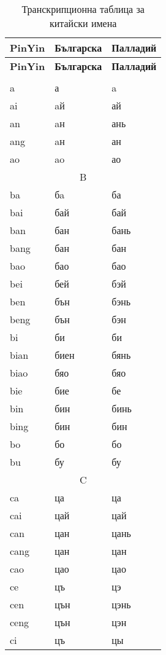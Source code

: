 \appendix

\appendixname

\begin{longtable}{|l|l|l|}
    \caption{Транскрипционна таблица за китайски имена} \label{tab:kitaiski_imena} \\
    \hline
    \textbf{PinYin} & \textbf{Българска} & \textbf{Палладий} \\
    \hline
    \endfirsthead
    \hline
    \textbf{PinYin} & \textbf{Българска} & \textbf{Палладий} \\
    \hline
    \endhead
    \hline
    \endfoot
    \hline
    \endlastfoot
    \multicolumn{3}{|c|}{A} \\
    \hline
    a &а &a\\
    ai &aй &ай
\\    an &aн &ань
\\    ang &aн &ан
\\    ao &ao &ао
 \\
    \hline
    \multicolumn{3}{|c|}{B} \\
    \hline
    ba &бa &ба
\\    bai &бай &бай
\\    ban &бан &бань
\\    bang &бан &бан
\\    bao &бао &бао
\\    bei &бей &бэй
\\    ben &бън &бэнь
\\    beng &бън &бэн
\\    bi &би &би
\\    bian &биен &бянь
\\    biao &бяо &бяо
\\    bie &бие &бе
\\    
    bin &бин &бинь
\\    bing &бин &бин
\\    bo &бо &бо
\\    bu &бу &бу 
\\
    \hline
    \multicolumn{3}{|c|}{C} \\
    \hline
    ca &ца &ца
\\    cai &цай &цай
\\    can &цан &цань
\\    cang &цан &цан
\\    cao &цао &цао
\\    ce &цъ &цэ
\\    cen &цън &цэнь
\\    ceng &цън &цэн
\\    ci &цъ &цы

\end{longtable}
